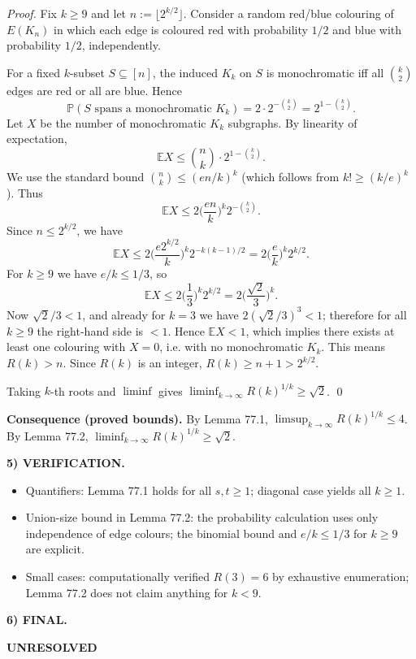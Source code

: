 \emph{Proof.}
Fix $k\ge 9$ and let $n:=\lfloor 2^{k/2}\rfloor$. Consider a random red/blue colouring of $E(K_n)$ in which each edge is coloured red with probability $1/2$ and blue with probability $1/2$, independently.

For a fixed $k$-subset $S\subseteq [n]$, the induced $K_k$ on $S$ is monochromatic iff all $\binom{k}{2}$ edges are red or all are blue. Hence
\[
\mathbb{P}(\text{$S$ spans a monochromatic }K_k)=2\cdot 2^{-\binom{k}{2}}=2^{1-\binom{k}{2}}.
\]
Let $X$ be the number of monochromatic $K_k$ subgraphs. By linearity of expectation,
\[
\mathbb{E}X \le \binom{n}{k} \cdot 2^{1-\binom{k}{2}}.
\]
We use the standard bound $\binom{n}{k}\le (en/k)^k$ (which follows from $k!\ge (k/e)^k$). Thus
\[
\mathbb{E}X \le 2\Big(\frac{en}{k}\Big)^k 2^{-\binom{k}{2}}.
\]
Since $n\le 2^{k/2}$, we have
\[
\mathbb{E}X \le 2\Big(\frac{e 2^{k/2}}{k}\Big)^k 2^{-k(k-1)/2}
=2\Big(\frac{e}{k}\Big)^k 2^{k/2}.
\]
For $k\ge 9$ we have $e/k\le 1/3$, so
\[
\mathbb{E}X \le 2\Big(\frac{1}{3}\Big)^k 2^{k/2} = 2\Big(\frac{\sqrt2}{3}\Big)^k.
\]
Now $\sqrt2/3<1$, and already for $k=3$ we have $2(\sqrt2/3)^3<1$; therefore for all $k\ge 9$ the right-hand side is $<1$. Hence $\mathbb{E}X<1$, which implies there exists at least one colouring with $X=0$, i.e. with no monochromatic $K_k$. This means $R(k)>n$. Since $R(k)$ is an integer, $R(k)\ge n+1>2^{k/2}$.

Taking $k$-th roots and $\liminf$ gives $\liminf_{k\to\infty} R(k)^{1/k}\ge \sqrt2$. \qed

\medskip
\noindent\textbf{Consequence (proved bounds).}
By Lemma 77.1, $\limsup_{k\to\infty}R(k)^{1/k}\le 4$. By Lemma 77.2, $\liminf_{k\to\infty}R(k)^{1/k}\ge \sqrt2$.

\medskip
\noindent\textbf{5) VERIFICATION.}

\begin{itemize}
\item Quantifiers: Lemma 77.1 holds for all $s,t\ge 1$; diagonal case yields all $k\ge 1$.
\item Union-size bound in Lemma 77.2: the probability calculation uses only independence of edge colours; the binomial bound and $e/k\le 1/3$ for $k\ge 9$ are explicit.
\item Small cases: computationally verified $R(3)=6$ by exhaustive enumeration; Lemma 77.2 does not claim anything for $k<9$.
\end{itemize}

\medskip
\noindent\textbf{6) FINAL.}

\textbf{UNRESOLVED}

